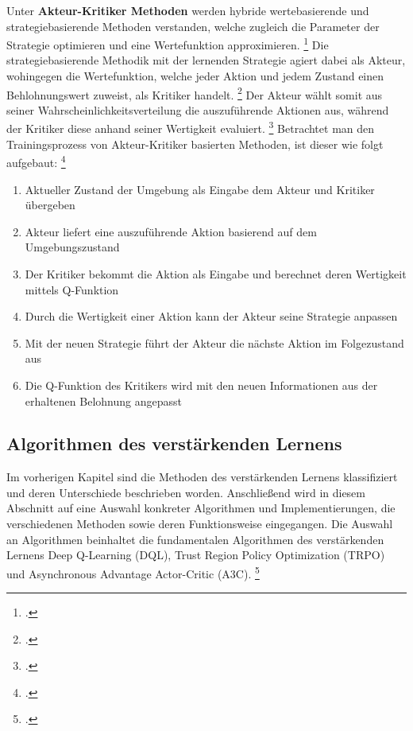 Unter \textbf{Akteur-Kritiker Methoden} werden hybride wertebasierende und strategiebasierende Methoden verstanden, welche zugleich die Parameter der Strategie optimieren und eine Wertefunktion approximieren. \footcite[Vgl.][S. 2f.]{Zhang.2018}
Die strategiebasierende Methodik mit der lernenden Strategie agiert dabei als Akteur, wohingegen die Wertefunktion, welche jeder Aktion und jedem Zustand einen Behlohnungswert zuweist, als Kritiker handelt. \footcite[Vgl.][S. 321]{Sutton.2018}
Der Akteur wählt somit aus seiner Wahrscheinlichkeitsverteilung die auszuführende Aktionen aus, während der Kritiker diese anhand seiner Wertigkeit evaluiert. \footcite[Vgl.][S. 3]{Ningombam.2022}
Betrachtet man den Trainingsprozess von Akteur-Kritiker basierten Methoden, ist dieser wie folgt aufgebaut: \footcite[Vgl.][S. 4]{Ningombam.2022}
\begin{enumerate}
    \item Aktueller Zustand der Umgebung als Eingabe dem Akteur und Kritiker übergeben
    \item Akteur liefert eine auszuführende Aktion basierend auf dem Umgebungszustand
    \item Der Kritiker bekommt die Aktion als Eingabe und berechnet deren Wertigkeit mittels Q-Funktion
    \item Durch die Wertigkeit einer Aktion kann der Akteur seine Strategie anpassen
    \item Mit der neuen Strategie führt der Akteur die nächste Aktion im Folgezustand aus
    \item Die Q-Funktion des Kritikers wird mit den neuen Informationen aus der erhaltenen Belohnung angepasst
\end{enumerate}

\subsection{Algorithmen des verstärkenden Lernens}
Im vorherigen Kapitel sind die Methoden des verstärkenden Lernens klassifiziert und deren Unterschiede beschrieben worden.
Anschließend wird in diesem Abschnitt auf eine Auswahl konkreter Algorithmen und Implementierungen, die verschiedenen Methoden sowie deren Funktionsweise eingegangen.
Die Auswahl an Algorithmen beinhaltet die fundamentalen Algorithmen des verstärkenden Lernens Deep Q-Learning (DQL), Trust Region Policy Optimization (TRPO) und Asynchronous Advantage Actor-Critic (A3C). \footcite[Vgl.][S. 1]{Arulkumaran.2017}

